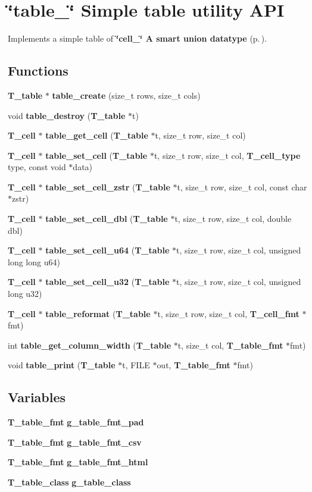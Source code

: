 \section{\char`\"{}table\_\-\char`\"{} Simple table utility API}
\label{group__simple__table}
Implements a simple table of {\bf \char`\"{}cell\_\-\char`\"{} A smart union datatype} {\rm (p.\,\pageref{group__table__cell})}. 
\subsection*{Functions}
\begin{CompactItemize}
\item 
{\bf T\_\-table} $\ast$ {\bf table\_\-create} (size\_\-t rows, size\_\-t cols)
\item 
void {\bf table\_\-destroy} ({\bf T\_\-table} $\ast$t)
\item 
{\bf T\_\-cell} $\ast$ {\bf table\_\-get\_\-cell} ({\bf T\_\-table} $\ast$t, size\_\-t row, size\_\-t col)
\item 
{\bf T\_\-cell} $\ast$ {\bf table\_\-set\_\-cell} ({\bf T\_\-table} $\ast$t, size\_\-t row, size\_\-t col, {\bf T\_\-cell\_\-type} type, const void $\ast$data)
\item 
{\bf T\_\-cell} $\ast$ {\bf table\_\-set\_\-cell\_\-zstr} ({\bf T\_\-table} $\ast$t, size\_\-t row, size\_\-t col, const char $\ast$zstr)
\item 
{\bf T\_\-cell} $\ast$ {\bf table\_\-set\_\-cell\_\-dbl} ({\bf T\_\-table} $\ast$t, size\_\-t row, size\_\-t col, double dbl)
\item 
{\bf T\_\-cell} $\ast$ {\bf table\_\-set\_\-cell\_\-u64} ({\bf T\_\-table} $\ast$t, size\_\-t row, size\_\-t col, unsigned long long u64)
\item 
{\bf T\_\-cell} $\ast$ {\bf table\_\-set\_\-cell\_\-u32} ({\bf T\_\-table} $\ast$t, size\_\-t row, size\_\-t col, unsigned long u32)
\item 
{\bf T\_\-cell} $\ast$ {\bf table\_\-reformat} ({\bf T\_\-table} $\ast$t, size\_\-t row, size\_\-t col, {\bf T\_\-cell\_\-fmt} $\ast$fmt)
\item 
int {\bf table\_\-get\_\-column\_\-width} ({\bf T\_\-table} $\ast$t, size\_\-t col, {\bf T\_\-table\_\-fmt} $\ast$fmt)
\item 
void {\bf table\_\-print} ({\bf T\_\-table} $\ast$t, FILE $\ast$out, {\bf T\_\-table\_\-fmt} $\ast$fmt)
\end{CompactItemize}
\subsection*{Variables}
\begin{CompactItemize}
\item 
{\bf T\_\-table\_\-fmt} {\bf g\_\-table\_\-fmt\_\-pad}
\item 
{\bf T\_\-table\_\-fmt} {\bf g\_\-table\_\-fmt\_\-csv}
\item 
{\bf T\_\-table\_\-fmt} {\bf g\_\-table\_\-fmt\_\-html}
\item 
{\bf T\_\-table\_\-class} {\bf g\_\-table\_\-class}
\end{CompactItemize}


